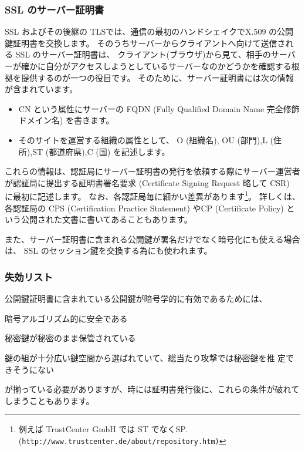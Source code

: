 \documentclass[mingoth,a4paper]{jsarticle}
\begin{document}
\subsubsection{SSL のサーバー証明書}
SSL およびその後継の TLS\cite{RFC2818}では、通信の最初のハンドシェイクでX.509 の公開鍵証明書を交換します。
そのうちサーバーからクライアントへ向けて送信される SSL のサーバー証明書は、
クライアント(ブラウザ)から見て、相手のサーバーが確かに自分がアクセスしようとしているサーバーなのかどうかを確認する根拠を提供するのが一つの役目です。
そのために、サーバー証明書には次の情報が含まれています。
\begin{itemize}
\item CN という属性にサーバーの FQDN (Fully Qualified Domain Name 完全修飾ドメイン名) を書きます。
\item そのサイトを運営する組織の属性として、 O (組織名), OU (部門),L (住所),ST (都道府県),C (国) を記述します。
\end{itemize}
これらの情報は、認証局にサーバー証明書の発行を依頼する際にサーバー運営者が認証局に提出する証明書署名要求 (Certificate Signing Request 略して CSR) に最初に記述します。
なお、各認証局毎に細かい差異があります\footnote{例えば TrustCenter GmbH では ST でなくSP. (\tt http://www.trustcenter.de/about/repository.htm)}。
詳しくは、各認証局の CPS (Certification Practice Statement) やCP (Certificate Policy) という公開された文書に書いてあることもあります。

また、サーバー証明書に含まれる公開鍵が署名だけでなく暗号化にも使える場合は、 SSL のセッション鍵を交換する為にも使われます。

\subsubsection{失効リスト}\label{sec:crl}

公開鍵証明書に含まれている公開鍵が暗号学的に有効であるためには、
\begin{list}{条件. }{\protect{}}
\item 暗号アルゴリズム的に安全である
\item 秘密鍵が秘密のまま保管されている\label{cond:secret}
\item 鍵の組が十分広い鍵空間から選ばれていて、総当たり攻撃では秘密鍵を推
      定できそうにない\label{cond:broadenough}
\end{list}
が揃っている必要がありますが、時には証明書発行後に、これらの条件が破れて
しまうこともあります。
\end{document}
